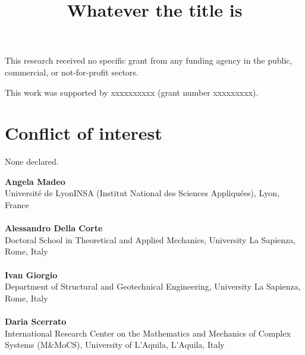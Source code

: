 
\renewcommand{\d}{{\,\rm d}} %
\usepackage{times}
\usepackage[format=plain,labelsep=period,labelfont=bf,size=small]{caption}
\usepackage{mathptmx}
\usepackage{txfonts}
\usepackage{fullpage}
\usepackage{varwidth}
\usepackage{xcolor}
\usepackage[noabbrev]{cleveref} %


\title{Whatever the title is}
\date{}
\maketitle

\begin{funding} 
This research received no specific grant from any funding agency in the public,
commercial, or not-for-profit sectors.
\end{funding} 

\begin{funding} 
This work was supported by xxxxxxxxxx (grant number xxxxxxxxx).
\end{funding} 


\section*{Conflict of interest} 

None declared.

\noindent\textbf{Angela Madeo}\\
Universit\'{e} de Lyon\textendash INSA (Institut National des Sciences
Appliquées), Lyon, France\\\\
\textbf{Alessandro Della Corte}\\
Doctoral School in Theoretical and Applied Mechanics, University La
Sapienza, Rome, Italy\\\\
\textbf{Ivan Giorgio}\\
Department of Structural and Geotechnical
Engineering, University La Sapienza, Rome, Italy\\\\
\textbf{Daria Scerrato}\\
International Research Center on the Mathematics and Mechanics of
Complex Systems (M\&MoCS), University of L'Aquila, L'Aquila, Italy%

